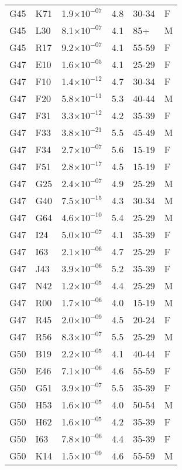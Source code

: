 \begin{longtable}{lllrll}
   G45 & K71 & 1.9$\times10^{-07}$ & 4.8 & 30-34 & F \\ 
   G45 & L30 & 8.1$\times10^{-07}$ & 4.1 & 85+ & M \\ 
   G45 & R17 & 9.2$\times10^{-07}$ & 4.1 & 55-59 & F \\ 
   G47 & E10 & 1.6$\times10^{-05}$ & 4.1 & 25-29 & F \\ 
   G47 & F10 & 1.4$\times10^{-12}$ & 4.7 & 30-34 & F \\ 
   G47 & F20 & 5.8$\times10^{-11}$ & 5.3 & 40-44 & M \\ 
   G47 & F31 & 3.3$\times10^{-12}$ & 4.2 & 35-39 & F \\ 
   G47 & F33 & 3.8$\times10^{-21}$ & 5.5 & 45-49 & M \\ 
   G47 & F34 & 2.7$\times10^{-07}$ & 5.6 & 15-19 & F \\ 
   G47 & F51 & 2.8$\times10^{-17}$ & 4.5 & 15-19 & F \\ 
   G47 & G25 & 2.4$\times10^{-07}$ & 4.9 & 25-29 & M \\ 
   G47 & G40 & 7.5$\times10^{-15}$ & 4.3 & 30-34 & M \\ 
   G47 & G64 & 4.6$\times10^{-10}$ & 5.4 & 25-29 & M \\ 
   G47 & I24 & 5.0$\times10^{-07}$ & 4.1 & 35-39 & F \\ 
   G47 & I63 & 2.1$\times10^{-06}$ & 4.7 & 25-29 & F \\ 
   G47 & J43 & 3.9$\times10^{-06}$ & 5.2 & 35-39 & F \\ 
   G47 & N42 & 1.2$\times10^{-05}$ & 4.4 & 25-29 & M \\ 
   G47 & R00 & 1.7$\times10^{-06}$ & 4.0 & 15-19 & M \\ 
   G47 & R45 & 2.0$\times10^{-09}$ & 4.5 & 20-24 & F \\ 
   G47 & R56 & 8.3$\times10^{-07}$ & 5.5 & 25-29 & M \\ 
   G50 & B19 & 2.2$\times10^{-05}$ & 4.1 & 40-44 & F \\ 
   G50 & E46 & 7.1$\times10^{-06}$ & 4.6 & 55-59 & F \\ 
   G50 & G51 & 3.9$\times10^{-07}$ & 5.5 & 35-39 & F \\ 
   G50 & H53 & 1.6$\times10^{-05}$ & 4.0 & 50-54 & M \\ 
   G50 & H62 & 1.6$\times10^{-05}$ & 4.2 & 35-39 & F \\ 
   G50 & I63 & 7.8$\times10^{-06}$ & 4.4 & 35-39 & F \\ 
   G50 & K14 & 1.5$\times10^{-09}$ & 4.6 & 55-59 & M \\ 

\end{longtable}
